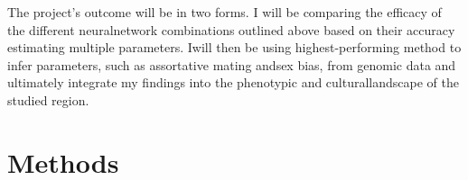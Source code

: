 \documentclass[11pt]{article}
\begin{document}
The project’s outcome will be in two forms.  I will be comparing the efficacy of the different neuralnetwork combinations outlined above based on their accuracy estimating multiple parameters.  Iwill then be using highest-performing method to infer parameters, such as assortative mating andsex bias, from genomic data and ultimately integrate my findings into the phenotypic and culturallandscape of the studied region.





























\vspace{5mm}
\section{Methods}


\end{document}

